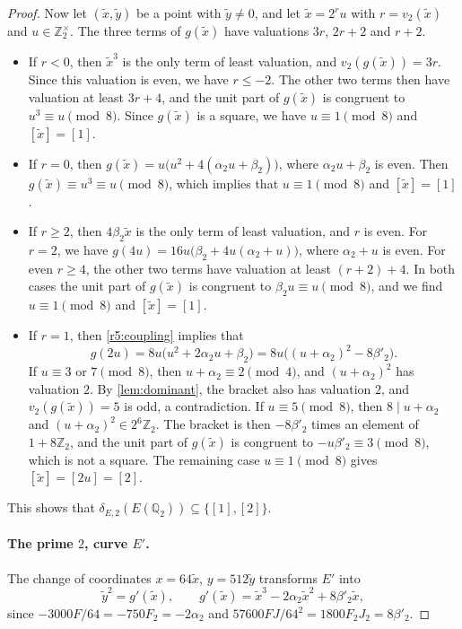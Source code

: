 \documentclass[12pt,oneside,openany]{book}
\theoremstyle{definition}
\theoremstyle{plain}
\numberwithin{equation}{chapter}
\theoremstyle{plain}
\theoremstyle{definition}
\theoremstyle{remark}
\newcommand{\Q}{\mathbb Q}
\newcommand{\Z}{\mathbb Z}
\newcommand{\sq}[1]{[#1]}
\begin{document}
\begin{proof}
Now let $(\tilde x,\tilde y)$ be a point with $\tilde y\ne0$, and let $\tilde x=2^ru$ with $r=v_2(\tilde x)$ and $u\in\Z_2^\times$. The three terms of $g(\tilde x)$ have valuations $3r$, $2r+2$ and $r+2$.
\begin{itemize}
\item If $r<0$, then $\tilde x^3$ is the only term of least valuation, and $v_2(g(\tilde x))=3r$. Since this valuation is even, we have $r\le-2$. The other two terms then have valuation at least $3r+4$, and the unit part of $g(\tilde x)$ is congruent to $u^3\equiv u\pmod 8$. Since $g(\tilde x)$ is a square, we have $u\equiv1\pmod8$ and $\sq{\tilde x}=\sq1$.
\item If $r=0$, then $g(\tilde x)=u\big(u^2+4(\alpha_2 u+\beta_2)\big)$, where $\alpha_2 u+\beta_2$ is even. Then $g(\tilde x)\equiv u^3\equiv u\pmod8$, which implies that $u\equiv1\pmod8$ and $\sq{\tilde x}=\sq1$.
\item If $r\ge2$, then $4\beta_2 \tilde x$ is the only term of least valuation, and $r$ is even. For $r=2$, we have $g(4u)=16u\big(\beta_2+4u(\alpha_2+u)\big)$, where $\alpha_2+u$ is even. For even $r\ge4$, the other two terms have valuation at least $(r+2)+4$. In both cases the unit part of $g(\tilde x)$ is congruent to $\beta_2 u\equiv u\pmod8$, and we find $u\equiv1\pmod8$ and $\sq{\tilde x}=\sq1$.
\item If $r=1$, then \eqref{r5:coupling} implies that
\[
g(2u)=8u\big(u^2+2\alpha_2 u+\beta_2\big)=8u\big((u+\alpha_2)^2-8\beta'_2\big).
\]
If $u\equiv3$ or $7\pmod8$, then $u+\alpha_2\equiv2\pmod4$, and $(u+\alpha_2)^2$ has valuation $2$. By \cref{lem:dominant}, the bracket also has valuation $2$, and $v_2(g(\tilde x))=5$ is odd, a contradiction. If $u\equiv5\pmod8$, then $8\mid u+\alpha_2$ and $(u+\alpha_2)^2\in2^6\Z_2$. The bracket is then $-8\beta'_2$ times an element of $1+8\Z_2$, and the unit part of $g(\tilde x)$ is congruent to $-u\beta'_2\equiv3\pmod8$, which is not a square. The remaining case $u\equiv1\pmod8$ gives $\sq{\tilde x}=\sq{2u}=\sq2$.
\end{itemize}
This shows that $\delta_{E,2}(E(\Q_2))\subseteq\{\sq1,\sq2\}$.

\paragraph{The prime $2$, curve $E'$.} The change of coordinates $x=64\tilde x$, $y=512\tilde y$ transforms $E'$ into
\[
\tilde y^2=g'(\tilde x),\qquad g'(\tilde x)=\tilde x^3-2\alpha_2 \tilde x^2+8\beta'_2 \tilde x,
\]
since $-3000F/64=-750F_2=-2\alpha_2$ and $57600FJ/64^2=1800F_2J_2=8\beta'_2$.


\end{proof}
\end{document}
